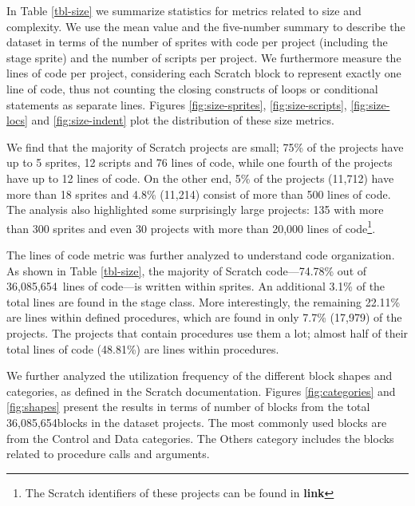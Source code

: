\documentclass{sig-alternate}
\newcommand{\nLOC}{36,085,654}
\newcommand{\todo}[1]{\textbf{#1}}
\begin{document}
In Table \ref{tbl-size} we summarize statistics for metrics related to size and complexity. We use the mean value and the five-number summary to describe the dataset in terms of the number of sprites with code per project (including the stage sprite) and the number of scripts per project. We furthermore measure the lines of code per project, considering each Scratch block to represent exactly one line of code, thus not counting the closing constructs of loops or conditional statements as separate lines. Figures \ref{fig:size-sprites}, \ref{fig:size-scripts}, \ref{fig:size-locs} and \ref{fig:size-indent} plot the distribution of these size metrics.

We find that the majority of Scratch projects are small; 75\% of the projects have up to 5 sprites, 12 scripts and 76 lines of code, while one fourth of the projects have up to 12 lines of code. On the other end, 5\% of the projects (11,712) have more than 18 sprites and 4.8\% (11,214) consist of more than 500 lines of code. The analysis also highlighted some surprisingly large projects: 135 with more than 300 sprites and even 30 projects with more than 20,000 lines of code\footnote{The Scratch identifiers of these projects can be found in \todo{link}}.

The lines of code metric was further analyzed to understand code organization. As shown in Table \ref{tbl-size}, the majority of Scratch code---74.78\% out of \nLOC~lines of code---is written within sprites. An additional 3.1\% of the total lines are found in the stage class. More interestingly, the remaining 22.11\% are lines within defined procedures, which are found in only 7.7\% (17,979) of the projects. The projects that contain procedures use them a lot; almost half of their total lines of code (48.81\%) are lines within procedures.

We further analyzed the utilization frequency of the different block shapes and categories, as defined in the Scratch documentation. Figures \ref{fig:categories} and \ref{fig:shapes} present the results in terms of number of blocks from the total \nLOC blocks in the dataset projects. The most commonly used blocks are from the Control and Data categories. The Others category includes the blocks related to procedure calls and arguments.
\end{document}
